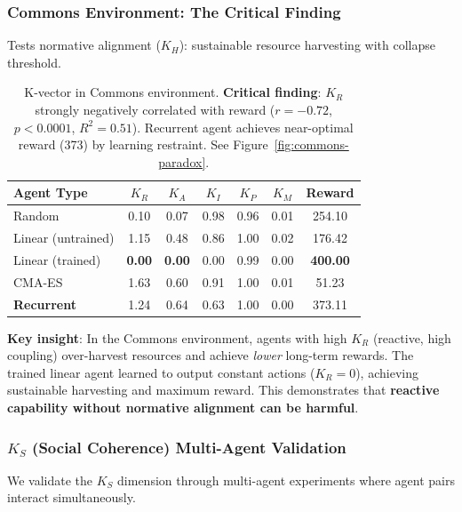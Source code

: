 \documentclass[11pt,a4paper]{article}
\newcommand{\kr}{K_R}
\newcommand{\ka}{K_A}
\newcommand{\ki}{K_I}
\newcommand{\kp}{K_P}
\newcommand{\km}{K_M}
\newcommand{\ks}{K_S}
\newcommand{\kh}{K_H}
\begin{document}
\subsubsection{Commons Environment: The Critical Finding}

Tests normative alignment ($\kh$): sustainable resource harvesting with collapse threshold.

\begin{table}[h]
\centering
\begin{tabular}{lcccccc}
\toprule
\textbf{Agent Type} & $\kr$ & $\ka$ & $\ki$ & $\kp$ & $\km$ & \textbf{Reward} \\
\midrule
Random & 0.10 & 0.07 & 0.98 & 0.96 & 0.01 & 254.10 \\
Linear (untrained) & 1.15 & 0.48 & 0.86 & 1.00 & 0.02 & 176.42 \\
Linear (trained) & \textbf{0.00} & \textbf{0.00} & 0.00 & 0.99 & 0.00 & \textbf{400.00} \\
CMA-ES & 1.63 & 0.60 & 0.91 & 1.00 & 0.01 & 51.23 \\
\textbf{Recurrent} & 1.24 & 0.64 & 0.63 & 1.00 & 0.00 & 373.11 \\
\bottomrule
\end{tabular}
\caption{K-vector in Commons environment. \textbf{Critical finding}: $\kr$ strongly negatively correlated with reward ($r = -0.72$, $p < 0.0001$, $R^2 = 0.51$). Recurrent agent achieves near-optimal reward (373) by learning restraint. See Figure~\ref{fig:commons-paradox}.}
\label{tab:commons-results}
\end{table}

\textbf{Key insight}: In the Commons environment, agents with high $\kr$ (reactive, high coupling) over-harvest resources and achieve \emph{lower} long-term rewards. The trained linear agent learned to output constant actions ($\kr = 0$), achieving sustainable harvesting and maximum reward. This demonstrates that \textbf{reactive capability without normative alignment can be harmful}.

\subsubsection{$\ks$ (Social Coherence) Multi-Agent Validation}

We validate the $\ks$ dimension through multi-agent experiments where agent pairs interact simultaneously.
\end{document}
